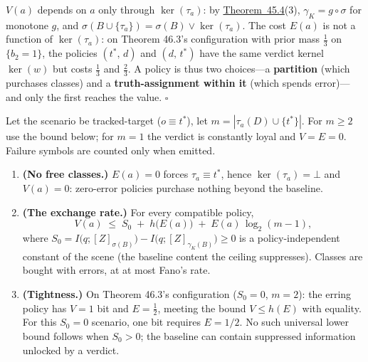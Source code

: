 \begin{thmplain}

\(V(a)\) depends on \(a\) only through \(\ker(\tau_a)\): by \hyperlink{stmt:45.4}{Theorem~45.4}(3), \(\gamma_K = g \circ \sigma\) for monotone \(g\), and \(\sigma(B \cup \{\tau_a\}) = \sigma(B) \vee \ker(\tau_a)\). The cost \(E(a)\) is not a function of \(\ker(\tau_a)\): on Theorem 46.3's configuration with prior mass \(\tfrac13\) on \(\{b_2 = 1\}\), the policies \((t^*\!,\, d)\) and \((d,\, t^*)\) have the same verdict kernel \(\ker(w)\) but costs \(\tfrac13\) and \(\tfrac23\). A policy is thus two choices---\hspace{0pt}a \textbf{partition} (which purchases classes) and a \textbf{truth-assignment within it} (which spends error)---\hspace{0pt}and only the first reaches the value. \(\square\)
\end{thmplain}

\begin{thmplain}

Let the scenario be tracked-target (\(o \equiv t^*\)), let \(m=|\tau_a(D)\cup\{t^*\}|\). For \(m\ge2\) use the bound below; for \(m=1\) the verdict is constantly loyal and \(V=E=0\). Failure symbols are counted only when emitted.

\begin{enumerate}
\def\labelenumi{\arabic{enumi}.}
\item
  \textbf{(No free classes.)} \(E(a) = 0\) forces \(\tau_a \equiv t^*\), hence \(\ker(\tau_a) = \bot\) and \(V(a) = 0\): zero-error policies purchase nothing beyond the baseline.
\item
  \textbf{(The exchange rate.)} For every compatible policy,
  \[
  V(a) \;\le\; S_0 \;+\; h\big(E(a)\big) \;+\; E(a)\,\log_2(m - 1),
  \]
  where \(S_0 = I\big(q; [Z]_{\sigma(B)}\big) - I\big(q; [Z]_{\gamma_K(B)}\big) \ge 0\) is a policy-independent constant of the scene (the baseline content the ceiling suppresses). Classes are bought with errors, at at most Fano's rate.
\item
  \textbf{(Tightness.)} On Theorem 46.3's configuration (\(S_0 = 0\), \(m = 2\)): the erring policy has \(V = 1\) bit and \(E = \tfrac12\), meeting the bound \(V \le h(E)\) with equality. For this \(S_0=0\) scenario, one bit requires \(E=1/2\). No such universal lower bound follows when \(S_0>0\); the baseline can contain suppressed information unlocked by a verdict.
\end{enumerate}
\end{thmplain}

